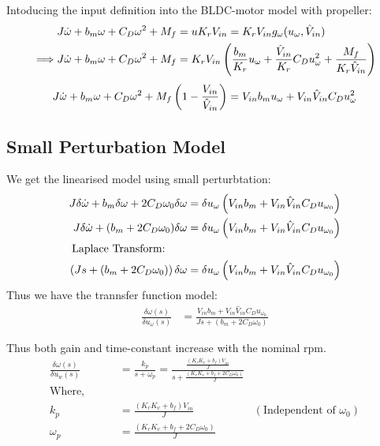 Intoducing the input definition into the BLDC-motor model with propeller:
\begin{align*}
    & J\dot \omega + b_m \omega + C_D \omega^2 + M_f = u K_r V_{in} = K_r V_{in} g_\omega(u_\omega, \hat V_{in})\\
    \implies & J \dot \omega + b_m \omega + C_D \omega^2 + M_f =K_r V_{in} \left( \frac{b_m}{K_r} u_\omega + \frac{\hat V_{in}}{K_r} C_D u_\omega^2 + \frac{M_f}{K_r  \hat V_{in}} \right)\\
\end{align*}
\begin{equation}
    J \dot \omega + b_m \omega + C_D \omega^2 + M_f \left( 1 - \frac{V_{in}}{\hat V_{in}} \right) = V_{in} b_m u_\omega + V_{in} \hat V_{in} C_D u_\omega^2\\
\end{equation}


\subsection{Small Perturbation Model}
We get the linearised model using small perturbtation:
\begin{align*}
    J \delta \dot \omega + b_m \delta \omega + 2 C_D \omega_0 \delta \omega  &= \delta u_\omega \left( V_{in} b_m + V_{in} \hat V_{in} C_D u_{\omega_0} \right)\\
    J \delta \dot \omega + (b_m + 2 C_D \omega_0) \delta \omega  &= \delta u_\omega \left( V_{in} b_m + V_{in} \hat V_{in} C_D u_{\omega_0} \right)\\
    \text{Laplace Transform:} \qquad &\\
     \left( Js + (b_m + 2 C_D \omega_0) \right) \delta \omega  &= \delta u_\omega \left( V_{in} b_m + V_{in} \hat V_{in} C_D u_{\omega_0} \right)
\end{align*}
Thus we have the trannsfer function model:
\begin{align*}
    \frac{\delta \omega(s)}{\delta u_\omega (s)} &= \frac{V_{in} b_m + V_{in} \hat V_{in} C_D u_{\omega_0}}{Js + (b_m + 2 C_D \omega_0)}
\end{align*}

Thus both gain and time-constant increase with the nominal rpm.
\begin{align*}
    \frac{\delta \omega(s)}{\delta u_w(s)} &= \frac{k_p}{s + \omega_p} = \frac{\frac{(K_rK_v + b_f) V_{in}}{J}}{s + \frac{(K_rK_v + b_f + 2 C_D \omega_0)}{J}}\\
    \text{Where, } \qquad &\\
    k_p &= \frac{(K_rK_v + b_f) V_{in}}{J} & (\text{Independent of } \omega_0)\\
    \omega_p &= \frac{(K_rK_v + b_f + 2 C_D \omega_0)}{J}
\end{align*}

